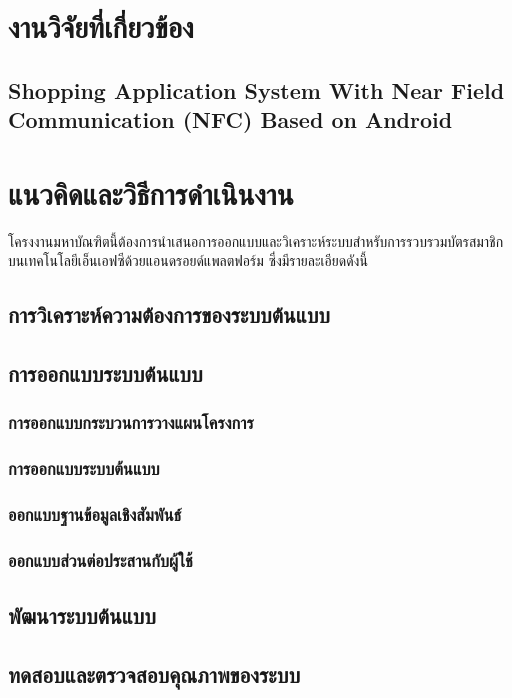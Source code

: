 \documentclass[a4paper]{article}
\begin{document}
\section{งานวิจัยที่เกี่ยวข้อง}

\subsection{Shopping Application System With Near Field Communication (NFC) Based on Android}

\section{แนวคิดและวิธีการดำเนินงาน}

โครงงานมหาบัณฑิตนี้ต้องการนําเสนอการออกแบบและวิเคราะห์ระบบสำหรับการรวบรวมบัตรสมาชิกบนเทคโนโลยีเอ็นเอฟซีด้วยแอนดรอยด์แพลตฟอร์ม ซึ่งมีรายละเอียดดังนี้

\subsection{การวิเคราะห์ความต้องการของระบบต้นแบบ}

\subsection{การออกแบบระบบต้นแบบ}

\subsubsection{การออกแบบกระบวนการวางแผนโครงการ}
\subsubsection{การออกแบบระบบต้นแบบ}
\subsubsection{ออกแบบฐานข้อมูลเชิงสัมพันธ์}
\subsubsection{ออกแบบส่วนต่อประสานกับผู้ใช้}

\subsection{พัฒนาระบบต้นแบบ}
\subsection{ทดสอบและตรวจสอบคุณภาพของระบบ}
\end{document}
